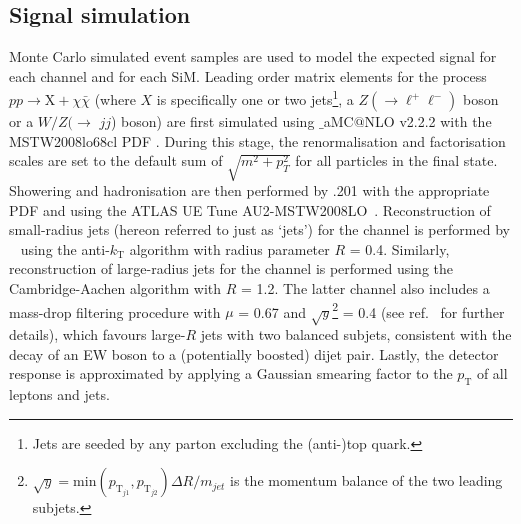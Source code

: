 \subsection{Signal simulation}
\label{signal_generation}
Monte Carlo simulated event samples are used to model the expected signal for each channel and for each SiM. Leading order matrix elements for the process $pp \rightarrow \mathrm{X} + \chi\bar{\chi}$ (where $X$ is specifically one or two jets\footnote{Jets are seeded by any parton excluding the (anti-)top quark.}, a $Z(\rightarrow \ell^+ \ell^-)$ boson or a $W/Z(\rightarrow$ $jj$) boson) are first simulated using \MGnospace$\_$aMC$@$NLO v2.2.2 \cite{MG_aMCNLO2014} with the MSTW2008lo68cl PDF \cite{MSTW}. During this stage, the renormalisation and factorisation scales are set to the default sum of $\sqrt{m^{2} + p_{T}^{2}}$ for all particles in the final state. Showering and hadronisation are then performed by \PYTHIA.201 \cite{pythia8} with the appropriate PDF and using the ATLAS UE Tune AU2-MSTW2008LO~\cite{AUtune}. Reconstruction of small-radius jets (hereon referred to just as `jets') for the \monojet channel is performed by \FASTJET~\cite{FastJet} using the anti-$k_{\mathrm{T}}$ algorithm with radius parameter $R$ = 0.4. Similarly, reconstruction of large-radius jets for the \monoWZ channel is performed using the Cambridge-Aachen algorithm with $R$ = 1.2. The latter channel also includes a mass-drop filtering procedure with $\mu$ = 0.67 and $\sqrt{y}$\footnote{$\sqrt{y} = \mathrm{min}(p_{\mathrm{T}_{j1}},p_{\mathrm{T}_{j2}})\Delta R / m_{jet}$ is the momentum balance of the two leading subjets.} = 0.4 (see ref.~\cite{massdrop} for further details), which favours large-$R$ jets with two balanced subjets, consistent with the decay of an EW boson to a (potentially boosted) dijet pair. Lastly, the detector response is approximated by applying a Gaussian smearing factor to the $p_{\mathrm{T}}$ of all leptons and jets.


